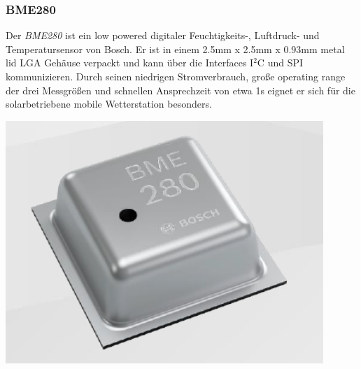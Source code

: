 \subsubsection{BME280}
\label{BME280}
{\begin{minipage}[b][6cm][t]{0.55\textwidth}
Der \textit{BME280} ist ein low powered digitaler Feuchtigkeits-, Luftdruck- und Temperatursensor von Bosch. Er ist in einem 2.5mm x 2.5mm x 0.93mm metal lid LGA Gehäuse verpackt und kann über die Interfaces I$^{2}$C und SPI kommunizieren. Durch seinen niedrigen Stromverbrauch, große operating range der drei Messgrößen und schnellen Ansprechzeit von etwa 1s eignet er sich für die solarbetriebene mobile Wetterstation besonders. \cite{Bosch2019}\\
\end{minipage}}
{\begin{minipage}[b][6cm][t]{0.44\textwidth}
\centering
\includegraphics[width=0.9\textwidth]{graphics/bme280/bme280.PNG}
\label{fig:bme280}
\end{minipage}}

